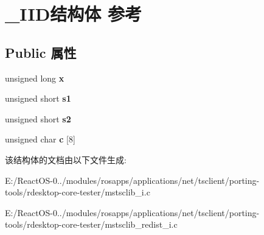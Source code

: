 \hypertarget{struct___i_i_d}{}\section{\+\_\+\+I\+I\+D结构体 参考}
\label{struct___i_i_d}
\subsection*{Public 属性}
\begin{DoxyCompactItemize}
\item 
\mbox{\label{struct___i_i_d_add28d3db785dd98f1178f7ea88f5495c}} 
unsigned long {\bfseries x}
\item 
\mbox{\label{struct___i_i_d_a23024837c1b267b2fe58b64d57b509da}} 
unsigned short {\bfseries s1}
\item 
\mbox{\label{struct___i_i_d_afbdacab5216098be663859a1d2764de7}} 
unsigned short {\bfseries s2}
\item 
\mbox{\label{struct___i_i_d_aa13b8da4d66ea5f5af6e66f173768b13}} 
unsigned char {\bfseries c} \mbox{[}8\mbox{]}
\end{DoxyCompactItemize}


该结构体的文档由以下文件生成\+:\begin{DoxyCompactItemize}
\item 
E\+:/\+React\+O\+S-\/0../modules/rosapps/applications/net/tsclient/porting-\/tools/rdesktop-\/core-\/tester/mstsclib\+\_\+i.\+c\item 
E\+:/\+React\+O\+S-\/0../modules/rosapps/applications/net/tsclient/porting-\/tools/rdesktop-\/core-\/tester/mstsclib\+\_\+redist\+\_\+i.\+c\end{DoxyCompactItemize}
